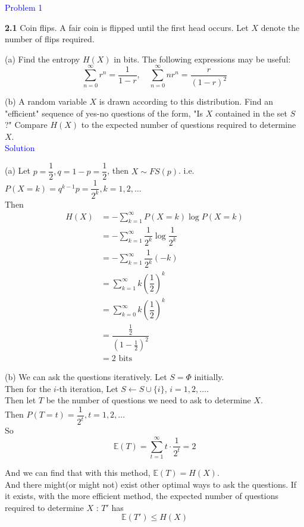 \textcolor{blue}{Problem 1}

\textbf{2.1} Coin flips. A fair coin is flipped until the first head occurs. Let $X$ denote the number of flips required.

(a) Find the entropy $H(X)$ in bits. The following expressions may be useful:
$$\sum_{n=0}^{\infty} r^n=\frac{1}{1-r}, \quad \sum_{n=0}^{\infty} n r^n=\frac{r}{(1-r)^2}$$

(b) A random variable $X$ is drawn according to this distribution. Find an "efficient" sequence of yes-no questions of the form, "Is $X$ contained in the set $S$ ?" Compare $H(X)$ to the expected number of questions required to determine $X$. \\

\textcolor{blue}{Solution}

(a) Let $p=\dfrac{1}{2}, q=1-p=\dfrac{1}{2}$, then $X\sim FS(p)$. i.e. $P(X=k)=q^{k-1}p=\dfrac{1}{2^k}, k=1,2,\ldots$ \\
Then
\begin{align*}
H(X) &= -\sum_{k=1}^{\infty} P(X=k)\log P(X=k) \\
&= -\sum_{k=1}^{\infty} \dfrac{1}{2^k}\log \dfrac{1}{2^k} \\
&= -\sum_{k=1}^{\infty} \dfrac{1}{2^k}(-k) \\
&= \sum_{k=1}^{\infty} k\left(\dfrac{1}{2}\right)^k \\
&= \sum_{k=0}^{\infty} k\left(\dfrac{1}{2}\right)^k \\
&= \dfrac{\frac{1}{2}}{\left(1-\frac{1}{2}\right)^2} \\
&= 2 \text{\ \ bits}
\end{align*}

(b) We can ask the questions iteratively. Let $S=\Phi$ initially.\\
Then for the $i$-th iteration, Let $S\leftarrow S\cup \{i\}$, $i=1,2,\ldots$. \\
Then let $T$ be the number of questions we need to ask to determine $X$. \\
Then $P(T=t)=\dfrac{1}{2^t}, t=1,2,\ldots$ \\
So
$$\mathbb{E}(T) = \sum_{t=1}^{\infty} t\cdot\dfrac{1}{2^t} = 2$$

And we can find that with this method, $\mathbb{E}(T)=H(X)$.\\
And there might(or might not) exist other optimal ways to ask the questions. If it exists, with the more efficient method, the expected number of questions required to determine $X$ : $T'$ has
$$\mathbb{E}(T')\leq H(X)$$


\newpage